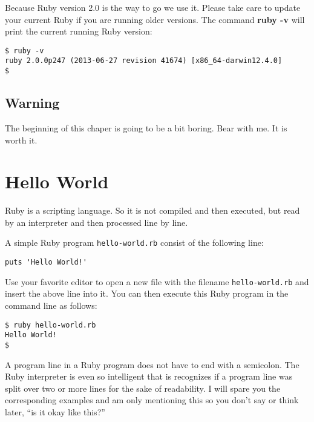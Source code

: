 \documentclass[a4paper]{book}
\begin{document}
Because Ruby version 2.0 is the way to go we use it. Please take care to update your current Ruby if you are running older versions. The command \textbf{ruby -v} will print the current running Ruby version:

\begin{shaded}\begin{verbatim}
$ ruby -v
ruby 2.0.0p247 (2013-06-27 revision 41674) [x86_64-darwin12.4.0]
$
\end{verbatim}\end{shaded}

\subsection{Warning}\label{warning}

The beginning of this chaper is going to be a bit boring. Bear with me. It is worth it.

\section{Hello World}\label{hello-world}

Ruby is a scripting language. So it is not compiled and then executed, but read by an interpreter and then processed line by line.

A simple Ruby program \texttt{hello-world.rb} consist of the following line:

\begin{shaded}\begin{verbatim}
puts 'Hello World!'
\end{verbatim}\end{shaded}

Use your favorite editor to open a new file with the filename \texttt{hello-world.rb} and insert the above line into it. You can then execute this Ruby program in the command line as follows:

\begin{shaded}\begin{verbatim}
$ ruby hello-world.rb
Hello World!
$
\end{verbatim}\end{shaded}

A program line in a Ruby program does not have to end with a semicolon. The Ruby interpreter is even so intelligent that is recognizes if a program line was split over two or more lines for the sake of readability. I will spare you the corresponding examples and am only mentioning this so you don't say or think later, “is it okay like this?”
\end{document}
